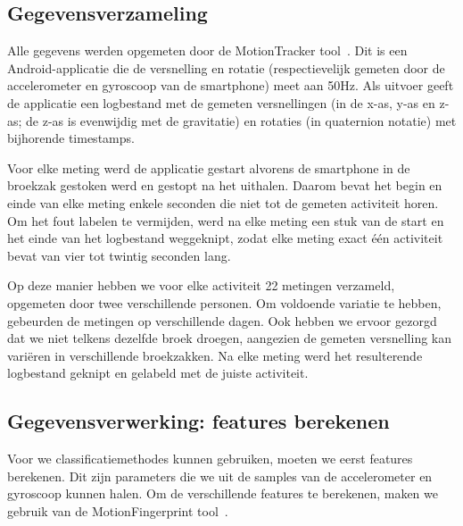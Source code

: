 \documentclass{article}
\begin{document}
\subsection{Gegevensverzameling}

Alle gegevens werden opgemeten door de MotionTracker tool~\cite{meert and schietgat:motiontracker}.
Dit is een Android-applicatie die de versnelling en rotatie (respectievelijk gemeten door de accelerometer en gyroscoop van de smartphone) meet aan 50Hz.  Als uitvoer geeft de applicatie een logbestand met de gemeten versnellingen (in de x-as, y-as en z-as; de z-as is evenwijdig met de gravitatie) en rotaties (in quaternion notatie) met bijhorende timestamps.

Voor elke meting werd de applicatie gestart alvorens de smartphone in de broekzak gestoken werd en gestopt na het uithalen. Daarom bevat het begin en einde van elke meting enkele seconden die niet tot de gemeten activiteit horen. Om het fout labelen te vermijden, werd na elke meting een stuk van de start en het einde van het logbestand weggeknipt, zodat elke meting exact \'e\'en activiteit bevat van vier tot twintig seconden lang. 

Op deze manier hebben we voor elke activiteit 22 metingen verzameld, opgemeten door twee verschillende personen. Om voldoende variatie te hebben, gebeurden de metingen op verschillende dagen. Ook hebben we ervoor gezorgd dat we niet telkens dezelfde broek droegen, aangezien de gemeten versnelling kan vari\"eren in verschillende broekzakken. Na elke meting werd het resulterende logbestand geknipt en gelabeld met de juiste activiteit.


\subsection{Gegevensverwerking: features berekenen}

Voor we classificatiemethodes kunnen gebruiken, moeten we eerst features berekenen. Dit zijn parameters die we uit de samples van de accelerometer en gyroscoop kunnen halen. Om de verschillende features te berekenen, maken we gebruik van de MotionFingerprint tool~\cite{meert and schietgat:motionfingerprint}. %


\end{document}
